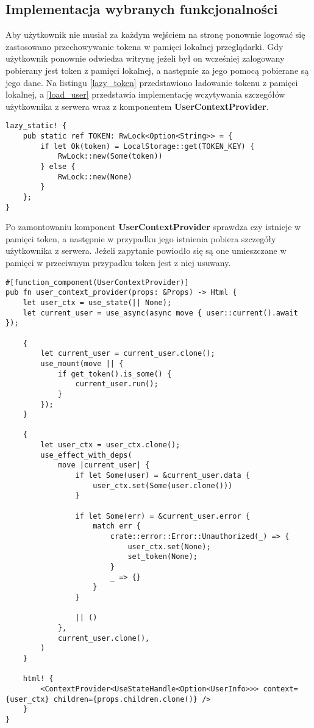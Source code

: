 \subsection{Implementacja wybranych funkcjonalności}
Aby użytkownik nie musiał za każdym wejściem na stronę ponownie logować się
zastosowano przechowywanie tokena w pamięci lokalnej przeglądarki.
Gdy użytkownik ponownie odwiedza witrynę jeżeli był on wcześniej zalogowany
pobierany jest token z pamięci lokalnej, a następnie za jego pomocą pobierane
są jego dane. Na listingu \ref{lazy_token} przedstawiono ładowanie tokenu z pamięci
lokalnej, a \ref{load_user} przedstawia implementację wczytywania szczegółów użytkownika
z serwera wraz z komponentem \textbf{UserContextProvider}.
\begin{lstlisting}[caption={Wczytywanie tokenu z pamięci lokalnej},label={lazy_token},captionpos=b]
lazy_static! {
    pub static ref TOKEN: RwLock<Option<String>> = {
        if let Ok(token) = LocalStorage::get(TOKEN_KEY) {
            RwLock::new(Some(token))
        } else {
            RwLock::new(None)
        }
    };
}
\end{lstlisting}
Po zamontowaniu komponent \textbf{UserContextProvider} sprawdza czy istnieje w pamięci token,
a następnie w przypadku jego istnienia pobiera szczegóły użytkownika z serwera.
Jeżeli zapytanie powiodło się są one umieszczane w pamięci w przeciwnym przypadku
token jest z niej usuwany.
\begin{lstlisting}[caption={Implementacja komponentu UserContextProvider},label={load_user},captionpos=b]
#[function_component(UserContextProvider)]
pub fn user_context_provider(props: &Props) -> Html {
    let user_ctx = use_state(|| None);
    let current_user = use_async(async move { user::current().await });

    {
        let current_user = current_user.clone();
        use_mount(move || {
            if get_token().is_some() {
                current_user.run();
            }
        });
    }

    {
        let user_ctx = user_ctx.clone();
        use_effect_with_deps(
            move |current_user| {
                if let Some(user) = &current_user.data {
                    user_ctx.set(Some(user.clone()))
                }

                if let Some(err) = &current_user.error {
                    match err {
                        crate::error::Error::Unauthorized(_) => {
                            user_ctx.set(None);
                            set_token(None);
                        }
                        _ => {}
                    }
                }

                || ()
            },
            current_user.clone(),
        )
    }

    html! {
        <ContextProvider<UseStateHandle<Option<UserInfo>>> context={user_ctx} children={props.children.clone()} />
    }
}
\end{lstlisting}

